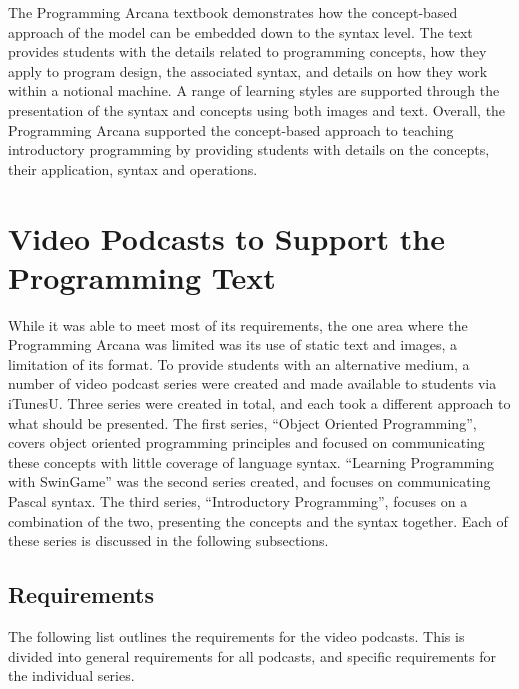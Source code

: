 The Programming Arcana textbook demonstrates how the concept-based approach of the model can be embedded down to the syntax level. The text provides students with the details related to programming concepts, how they apply to program design, the associated syntax, and details on how they work within a notional machine. A range of learning styles are supported through the presentation of the syntax and concepts using both images and text. Overall, the Programming Arcana supported the concept-based approach to teaching introductory programming by providing students with details on the concepts, their application, syntax and operations. 



\section{Video Podcasts to Support the Programming Text} %
\label{sec:vodcasts}

While it was able to meet most of its requirements, the one area where the Programming Arcana was limited was its use of static text and images, a limitation of its format. To provide students with an alternative medium, a number of video podcast series were created and made available to students via iTunesU. Three series were created in total, and each took a different approach to what should be presented. The first series, ``Object Oriented Programming'', covers object oriented programming principles and focused on communicating these concepts with little coverage of language syntax. ``Learning Programming with SwinGame'' was the second series created, and focuses on communicating Pascal syntax. The third series, ``Introductory Programming'', focuses on a combination of the two, presenting the concepts and the syntax together. Each of these series is discussed in the following subsections.

\subsection{Requirements} %
\label{sub:vodcast_requirements}

The following list outlines the requirements for the video podcasts. This is divided into general requirements for all podcasts, and specific requirements for the individual series.

